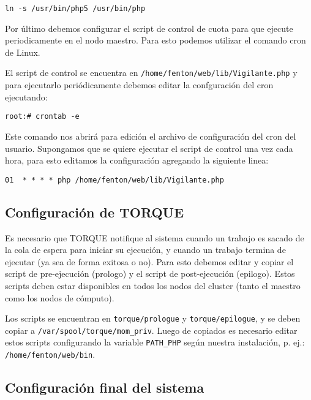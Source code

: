 \documentclass[a4paper,10pt,spanish]{article}
\begin{document}
\begin{verbatim}
ln -s /usr/bin/php5 /usr/bin/php
\end{verbatim}

Por \'{u}ltimo debemos configurar el script de control de cuota para que ejecute periodicamente en el nodo maestro. Para esto podemos utilizar el comando cron de Linux. 

El script de control se encuentra en \mbox{\texttt{/home/fenton/web/lib/Vigilante.php}} y para ejecutarlo peri\'{o}dicamente debemos editar la confguraci\'{o}n del cron ejecutando:

\begin{verbatim}
root:# crontab -e
\end{verbatim}

Este comando nos abrir\'{a} para edici\'{o}n el archivo de configuraci\'{o}n del cron del usuario. Supongamos que se quiere ejecutar el script de control una vez cada hora, para esto editamos la configuraci\'{o}n agregando la siguiente linea:

\begin{verbatim}
01  * * * * php /home/fenton/web/lib/Vigilante.php
\end{verbatim}

\subsection{Configuraci\'{o}n de TORQUE}

Es necesario que TORQUE notifique al sistema cuando un trabajo es sacado de la cola de espera para iniciar su ejecuci\'{o}n, y cuando un trabajo termina de ejecutar (ya sea de forma exitosa o no). Para esto debemos editar y copiar el script de pre-ejecuci\'{o}n (prologo) y el script de post-ejecuci\'{o}n (epilogo). Estos scripts deben estar disponibles en todos los nodos del cluster (tanto el maestro como los nodos de c\'{o}mputo). 

Los scripts se encuentran en \mbox{\texttt{torque/prologue}} y \mbox{\texttt{torque/epilogue}}, y se deben copiar a \mbox{\texttt{/var/spool/torque/mom\_priv}}. Luego de copiados es necesario editar estos scripts configurando la variable \mbox{\texttt{PATH\_PHP}} seg\'{u}n nuestra instalaci\'{o}n, p. ej.: \mbox{\texttt{/home/fenton/web/bin}}.

\subsection{Configuraci\'{o}n final del sistema}
\end{document}
